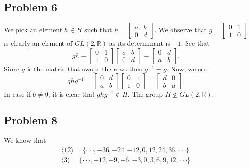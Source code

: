 \documentclass[a4paper,12pt]{article}
\begin{document}
\subsection*{Problem 6}
We pick an element $h \in H$ such that $h=\begin{bmatrix}
  a & b \\
  0 & d
\end{bmatrix}$. We observe that $g=\begin{bmatrix}
  0 & 1 \\
  1 & 0
\end{bmatrix}$ is clearly an element of $GL(2,\mathbb{R})$ as its determinant is $-1.$
See that \[gh=\begin{bmatrix}
  0 & 1 \\
  1 & 0
\end{bmatrix} \begin{bmatrix}
  a & b \\
  0 & d
\end{bmatrix}=\begin{bmatrix}
  0 & d \\
  a & b
\end{bmatrix}.\]
Since $g$ is the matrix that swaps the rows then $g^{-1}=g.$ Now, we see 
\[ghg^{-1}=\begin{bmatrix}
  0 & d \\
  a & b
\end{bmatrix} \begin{bmatrix}
  0 & 1 \\
  1 & 0
\end{bmatrix}=\begin{bmatrix}
  d &0  \\
  b & a
\end{bmatrix}.\]
In case if $b \ne 0$, it is clear that $ghg^{-1} \notin H.$ The group $H \ntrianglelefteq GL(2, \mathbb{R}).$
\subsection*{Problem 8}
    We know that
    \begin{align*} \langle 12 \rangle = \{ \cdot \cdot \cdot, -36, -24, -12, 0, 12 ,24, 36, \cdot \cdot \cdot\}\\
                    \langle 3 \rangle = \{ \cdot \cdot \cdot, -12,-9, -6, -3, 0, 3 , 6, 9,12, \cdot \cdot \cdot\}\end{align*}
\end{document}
